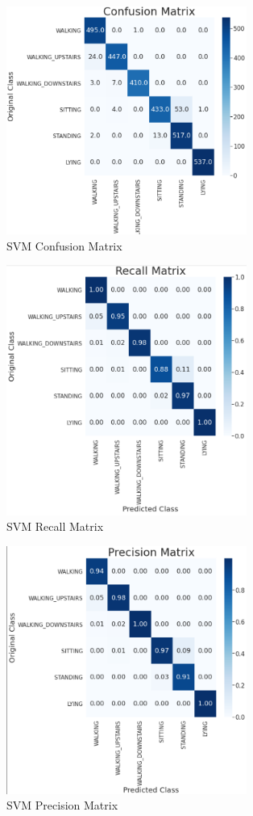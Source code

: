 \documentclass[12pt,conference]{IEEEtran}
\begin{document}
\begin{figure} [!t]
	\centering
	\includegraphics[width=3.1in]{svm_cm.PNG}
	\caption{SVM Confusion Matrix}
	\label{}
\end{figure}
\begin{figure} [!t]
	\centering
	\includegraphics[width=3.1in]{svm_recall.PNG}
	\caption{SVM Recall Matrix}
	\label{}
\end{figure}

\begin{figure} [!t]
	\centering
	\includegraphics[width=3.1in]{svm_pm.PNG}
	\caption{SVM Precision Matrix}
	\label{}
\end{figure}
\end{document}
